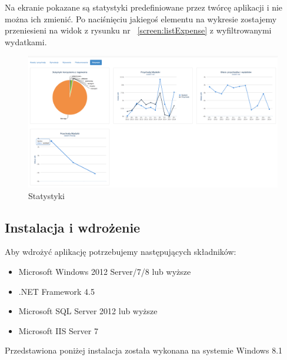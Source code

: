 \documentclass[10pt,titlepage]{article}
\begin{document}
Na ekranie pokazane są statystyki predefiniowane przez twórcę aplikacji i nie można ich zmienić. Po naciśnięciu jakiegoś elementu na wykresie zostajemy przeniesieni na widok z rysunku nr ~\ref{screen:listExpense} z wyfiltrowanymi wydatkami.
\begin{figure}[H]
  \centering
  \includegraphics[scale=0.2]{images/screen_statystyki.png}
  \caption{Statystyki}
\end{figure}
\subsection{Instalacja i wdrożenie}
Aby wdrożyć aplikację potrzebujemy następujących składników:
\begin{itemize}
  \item Microsoft Windows 2012 Server/7/8 lub wyższe
  \item .NET Framework 4.5
  \item Microsoft SQL Server 2012 lub wyższe
  \item Microsoft IIS Server 7
\end{itemize}
Przedstawiona poniżej instalacja została wykonana na systemie Windows 8.1
\end{document}

